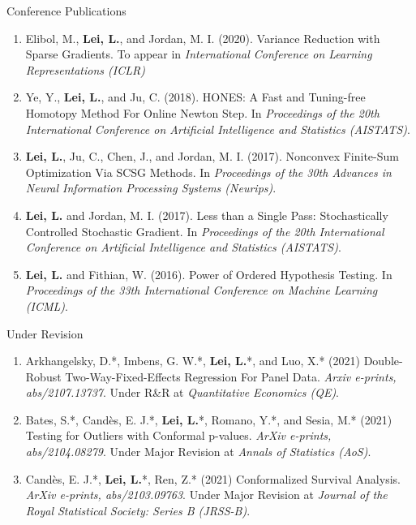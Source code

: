 \documentclass{article}
\begin{document}
\begin{large}
\noindent Conference Publications
\end{large}

\begin{enumerate}
\item Elibol, M., \textbf{Lei, L.}, and Jordan, M. I. (2020). Variance Reduction with Sparse Gradients. To appear in \emph{International Conference on Learning Representations (ICLR)}
\item Ye, Y., \textbf{Lei, L.}, and Ju, C. (2018). HONES: A Fast and Tuning-free Homotopy Method For Online Newton Step. In \emph{Proceedings of the 20th International Conference on Artificial Intelligence and Statistics (AISTATS)}.
\item \textbf{Lei, L.}, Ju, C., Chen, J., and Jordan, M. I. (2017). Nonconvex Finite-Sum Optimization Via SCSG Methods. In \emph{Proceedings of the 30th Advances in Neural Information Processing Systems (Neurips)}.
\item \textbf{Lei, L.} and Jordan, M. I. (2017). Less than a Single Pass: Stochastically Controlled Stochastic Gradient. In \emph{Proceedings of the 20th International Conference on Artificial Intelligence and Statistics (AISTATS)}.
\item \textbf{Lei, L.} and Fithian, W. (2016). Power of Ordered Hypothesis Testing. In \emph{Proceedings of the 33th International Conference on Machine Learning (ICML)}.
\end{enumerate}

\begin{large}
\noindent Under Revision
\end{large}

\begin{enumerate}
\item Arkhangelsky, D.*, Imbens, G. W.*, \textbf{Lei, L.}*, and Luo, X.* (2021) Double-Robust Two-Way-Fixed-Effects Regression For Panel Data. \emph{Arxiv e-prints, abs/2107.13737}. Under R\&R at \emph{Quantitative Economics (QE)}.
\item Bates, S.*, Cand\`{e}s, E. J.*, \textbf{Lei, L.}*, Romano, Y.*, and Sesia, M.* (2021) Testing for Outliers with Conformal p-values. \emph{ArXiv e-prints, abs/2104.08279}. Under Major Revision at \emph{Annals of Statistics (AoS)}.
\item Cand\`{e}s, E. J.*, \textbf{Lei, L.}*, Ren, Z.* (2021) Conformalized Survival Analysis. \emph{ArXiv e-prints, abs/2103.09763}. Under Major Revision at \emph{Journal of the Royal Statistical Society: Series B (JRSS-B)}.
\end{enumerate}
\end{document}
